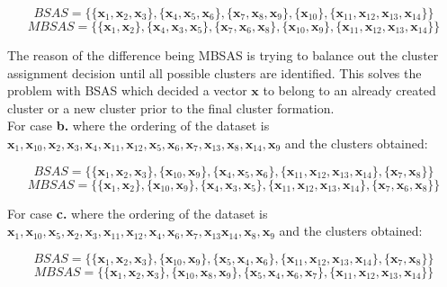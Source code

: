\documentclass[a4paper]{article}
\begin{document}
	$$BSAS = \{
		\{ \mathbf{x}_1,  \mathbf{x}_2,  \mathbf{x}_3 \},     
		\{ \mathbf{x}_4,  \mathbf{x}_5,  \mathbf{x}_6 \},     
		\{ \mathbf{x}_7,  \mathbf{x}_8,  \mathbf{x}_9 \},     
		\{ \mathbf{x}_{10} \},     
		\{ \mathbf{x}_{11},  \mathbf{x}_{12},  \mathbf{x}_{13},  \mathbf{x}_{14} \}
	\}$$
	$$MBSAS = \{
		\{ \mathbf{x}_1,  \mathbf{x}_2 \},     
		\{ \mathbf{x}_4,  \mathbf{x}_3,  \mathbf{x}_5 \},     
		\{ \mathbf{x}_7,  \mathbf{x}_6,  \mathbf{x}_8 \},     
		\{ \mathbf{x}_{10},  \mathbf{x}_9 \},     
		\{ \mathbf{x}_{11},  \mathbf{x}_{12},  \mathbf{x}_{13},  \mathbf{x}_{14} \}
	\}$$
	
	\noindent The reason of the difference being MBSAS is trying to balance out the cluster assignment decision until all possible clusters are identified. This solves the problem with BSAS which decided a vector $\mathbf{x}$ to belong to an already created cluster or a new cluster prior to the final cluster formation. \\
	
	For case \textbf{b.} where the ordering of the dataset is $\mathbf{x}_{1},   \mathbf{x}_{10},    \mathbf{x}_{2},    \mathbf{x}_{3},    \mathbf{x}_{4},   \mathbf{x}_{11},   \mathbf{x}_{12},    \mathbf{x}_{5},    \mathbf{x}_{6},    \mathbf{x}_{7},   \mathbf{x}_{13},     \mathbf{x}_{8},   \mathbf{x}_{14},    \mathbf{x}_{9}$ and the clusters obtained:
	
	$$BSAS = \{ \{ \mathbf{x}_{1}, \mathbf{x}_{2}, \mathbf{x}_{3} \},    
		\{ \mathbf{x}_{10}, \mathbf{x}_{9} \},    
		\{ \mathbf{x}_{4}, \mathbf{x}_{5}, \mathbf{x}_{6} \},    
		\{ \mathbf{x}_{11}, \mathbf{x}_{12}, \mathbf{x}_{13}, \mathbf{x}_{14} \},    
		\{ \mathbf{x}_{7}, \mathbf{x}_{8} \} \}$$
	$$MBSAS = \{ \{ \mathbf{x}_{1},  \mathbf{x}_{2} \},    
		\{ \mathbf{x}_{10},  \mathbf{x}_{9} \},    
		\{ \mathbf{x}_{4},  \mathbf{x}_{3},  \mathbf{x}_{5} \},    
		\{ \mathbf{x}_{11},  \mathbf{x}_{12},  \mathbf{x}_{13},  \mathbf{x}_{14} \},    
		\{ \mathbf{x}_{7},  \mathbf{x}_{6},  \mathbf{x}_{8} \} \}$$
		
	For case \textbf{c.} where the ordering of the dataset is $\mathbf{x}_{1},    \mathbf{x}_{10},     \mathbf{x}_{5},     \mathbf{x}_{2},     \mathbf{x}_{3},    \mathbf{x}_{11},    \mathbf{x}_{12},     \mathbf{x}_{4},     \mathbf{x}_{6},     \mathbf{x}_{7},    \mathbf{x}_{13}    \mathbf{x}_{14},     \mathbf{x}_{8},     \mathbf{x}_{9}$ and the clusters obtained:
	
	$$BSAS = \{ \{ \mathbf{x}_{1},  \mathbf{x}_{2},  \mathbf{x}_{3} \},     
		\{ \mathbf{x}_{10},  \mathbf{x}_{9} \},     
		\{ \mathbf{x}_{5},  \mathbf{x}_{4},  \mathbf{x}_{6} \},     
		\{ \mathbf{x}_{11},  \mathbf{x}_{12},  \mathbf{x}_{13},  \mathbf{x}_{14} \},     
		\{ \mathbf{x}_{7},  \mathbf{x}_{8} \} \}$$
	$$MBSAS = \{ \{ \mathbf{x}_{1},  \mathbf{x}_{2},  \mathbf{x}_{3} \},     
		\{ \mathbf{x}_{10},  \mathbf{x}_{8},  \mathbf{x}_{9} \},     
		\{ \mathbf{x}_{5},  \mathbf{x}_{4},  \mathbf{x}_{6},  \mathbf{x}_{7} \},     
		\{ \mathbf{x}_{11},  \mathbf{x}_{12},  \mathbf{x}_{13},  \mathbf{x}_{14} \} \}$$
\end{document}

